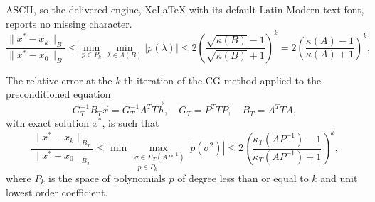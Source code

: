 \documentclass[10pt,a4paper]{amsart}
\newcommand{\bb}[1]{#1}
\begin{document}
ASCII, so the delivered engine, XeLaTeX with its default Latin Modern text font, reports no missing character.
\begin{equation}
    \label{eq:CGbound}
    \frac{\|x^*-x_k\|_B}{\|x^*-x_0\|_B} \leq \underset{p\in P_k}{\bb{\min}} \underset{\lambda \in \Lambda(B)}{\bb{\min}} |p(\lambda)| \leq 2 \left(\frac{\sqrt{\kappa(B)}-1}{\sqrt{\kappa(B)}+1} \right)^k = 2 \left(\frac{\kappa(A)-1}{\kappa(A)+1} \right)^k,
\end{equation}

\begin{theorem}
    \label{thm:conv}
    The relative error at the $k$-th iteration of the CG method applied to the preconditioned equation
    \begin{equation}
        \label{eq:PrecnormalPDE}
        G_T^{-1}B_T\vec{x} = G_T^{-1}A^TT\vec{b}, \quad G_T = P^TTP, \quad B_T = A^TTA,
    \end{equation}
    with exact solution $x^*$, is such that
    \begin{equation}
        \frac{\|x^* - x_k \|_{B_T}}{\|x^* - x_0 \|_{B_T}} \leq \underset{p\in P_k}{\bb{\min} \underset{\,\,\sigma \in \Sigma_T(AP^{-1})}{\bb{\max}}} |p(\sigma^2)| \leq 2 \left( \frac{\kappa_T(AP^{-1}) -1}{\kappa_T(AP^{-1}) +1} \right)^k,
    \end{equation}
    where $P_k$ is the space of polynomials $p$ of degree less than or equal to $k$ and unit lowest order coefficient.
\end{theorem}
\end{document}
